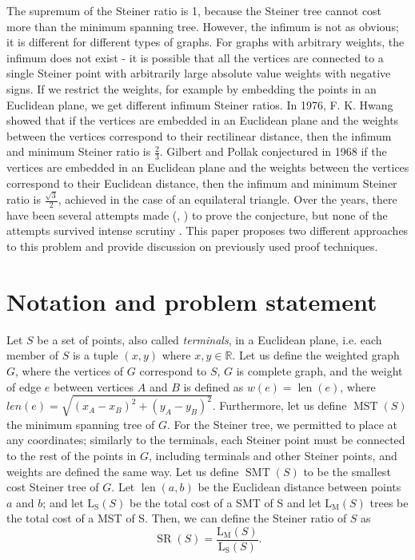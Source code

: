 \documentclass{mpaper}
\begin{document}
The supremum of the Steiner ratio is 1, because the Steiner tree cannot cost more than the minimum spanning tree. However, the infimum is not as obvious; it is different for different types of graphs. For graphs with arbitrary weights, the infimum does not exist - it is possible that all the vertices are connected to a single Steiner point with arbitrarily large absolute value weights with negative signs. If we restrict the weights, for example by embedding the points in an Euclidean plane, we get different infimum Steiner ratios. In 1976, F. K. Hwang \cite{doi:10.1137/0130013} showed that if the vertices are embedded in an Euclidean plane and the weights between the vertices correspond to their rectilinear distance, then the infimum and minimum Steiner ratio is $\frac{2}{3}$. Gilbert and Pollak conjectured in 1968 \cite{GP1968} if the vertices are embedded in an Euclidean plane and the weights between the vertices correspond to their Euclidean distance, then the infimum and minimum Steiner ratio is $\frac{\sqrt{3}}{2}$, achieved in the case of an equilateral triangle. Over the years, there have been several attempts made (\cite{doi:10.1073/pnas.87.23.9464}, \cite{myue}) to prove the conjecture, but none of the attempts survived intense scrutiny \cite{Ivanov2012}. This paper proposes two different approaches to this problem and provide discussion on previously used proof techniques.


\section{Notation and problem statement}

Let $S$ be a set of points, also called \emph{terminals}, in a Euclidean plane, i.e. each member of $S$ is a tuple $(x,y)$ where $x,y\in\mathbb{R}$. Let us define the weighted graph $G$, where the vertices of $G$ correspond to $S$, $G$ is complete graph, and the weight of edge $e$ between vertices $A$ and $B$ is defined as $w(e)=\operatorname{len}(e)$, where $len(e) = \sqrt{(x_A-x_B)^2+(y_A-y_B)^2}$. Furthermore, let us define $\operatorname{MST}(S)$ the minimum spanning tree of $G$. For the Steiner tree, we permitted to place at any coordinates; similarly to the terminals, each Steiner point must be connected to the rest of the points in $G$, including terminals and other Steiner points, and weights are defined the same way. Let us define $\operatorname{SMT}(S)$ to be the smallest cost Steiner tree of $G$. 
Let $\operatorname{len}(a,b)$ be the Euclidean distance between points $a$ and $b$; and let $\operatorname{L_S}(S)$ be the total cost of a SMT of S and let $\operatorname{L_M}(S)$ trees be the total cost of a MST of S.  Then, we can define the Steiner ratio of $S$ as
$$\operatorname{SR}(S)=\frac{\operatorname{L_M}(S)}{\operatorname{L_S}(S)}.$$
\end{document}

